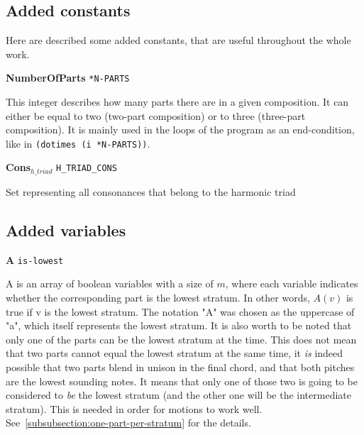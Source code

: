 \subsection{Added constants}
Here are described some added constants, that are useful throughout the whole work.

\vspace{.5cm} \noindent \textbf{NumberOfParts} \hspace{.2cm} \texttt{*N-PARTS}

This integer describes how many parts there are in a given composition. It can either be equal to two (two-part composition) or to three (three-part composition). It is mainly used in the loops of the program as an end-condition, like in \texttt{(dotimes (i *N-PARTS))}.

\vspace{.5cm} \noindent \textbf{Cons$_{h\_triad}$} \hspace{.2cm} \texttt{H\_TRIAD\_CONS}

Set representing all consonances that belong to the harmonic triad

\subsection{Added variables}
\vspace{.5cm} \noindent \textbf{A} \hspace{.cm} \texttt{is-lowest} \label{is-lowest}

A is an array of boolean variables with a size of $m$, where each variable indicates whether the corresponding part is the lowest stratum. In other words, $A(v)$ is true if v is the lowest stratum. The notation "A" was chosen as the uppercase of "a", which itself represents the lowest stratum. 
It is also worth to be noted that only one of the parts can be the lowest stratum at the time. This does not mean that two parts cannot equal the lowest stratum at the same time, it \textit{is} indeed possible that two parts blend in unison in the final chord, and that both pitches are the lowest sounding notes. It means that only one of those two is going to be considered to \textit{be} the lowest stratum (and the other one will be the intermediate stratum). This is needed in order for motions to work well. See~\ref{subsubsection:one-part-per-stratum} for the details.

